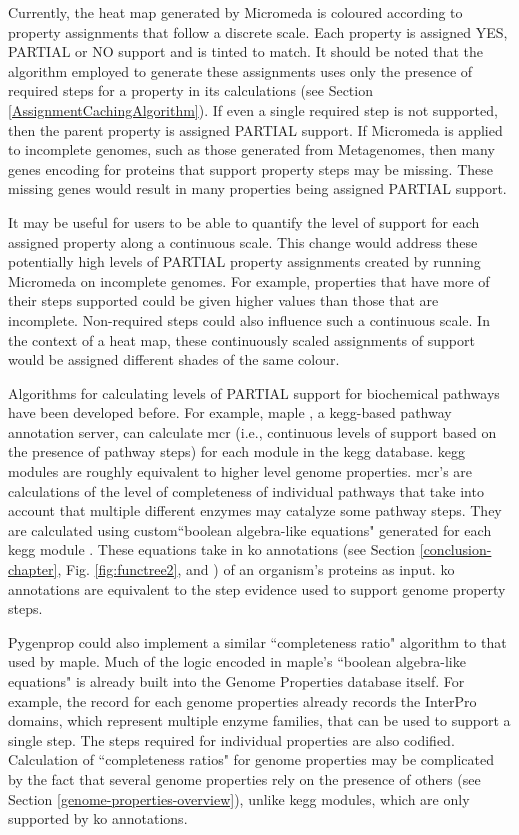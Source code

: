 Currently, the heat map generated by Micromeda is coloured according to property assignments that follow a discrete scale. Each property is assigned YES, PARTIAL or NO support and is tinted to match. It should be noted that the algorithm employed to generate these assignments uses only the presence of required steps for a property in its calculations (see Section \ref{AssignmentCachingAlgorithm}). If even a single required step is not supported, then the parent property is assigned PARTIAL support. If Micromeda is applied to incomplete genomes, such as those generated from Metagenomes, then many genes encoding for proteins that support property steps may be missing. These missing genes would result in many properties being assigned PARTIAL support. 

It may be useful for users to be able to quantify the level of support for each assigned property along a continuous scale. This change would address these potentially high levels of PARTIAL property assignments created by running Micromeda on incomplete genomes. For example, properties that have more of their steps supported could be given higher values than those that are incomplete. Non-required steps could also influence such a continuous scale. In the context of a heat map, these continuously scaled assignments of support would be assigned different shades of the same colour.

Algorithms for calculating levels of PARTIAL support for biochemical pathways have been developed before. For example, \gls{maple} \cite{takami2016automated}, a \gls{kegg}-based pathway annotation server, can calculate \gls{mcr} (i.e., continuous levels of support based on the presence of pathway steps) for each module in the \gls{kegg}  database. \gls{kegg} modules are roughly equivalent to higher level genome properties. \gls{mcr}'s are calculations of the level of completeness of individual pathways that take into account that multiple different enzymes may catalyze some pathway steps. They are calculated using custom``boolean algebra-like equations" generated for each \gls{kegg} module \cite{takami2012evaluation}. These equations take in \gls{ko} annotations (see Section \ref{conclusion-chapter}, Fig. \ref{fig:functree2}, and \cite{mao2005automated}) of an organism's proteins as input. \gls{ko} annotations are equivalent to the step evidence used to support genome property steps. 

Pygenprop could also implement a similar ``completeness ratio" algorithm to that used by \gls{maple}. Much of the logic encoded in \gls{maple}'s ``boolean algebra-like equations" is already built into the Genome Properties database itself. For example, the record for each genome properties already records the InterPro domains, which represent multiple enzyme families, that can be used to support a single step. The steps required for individual properties are also codified. Calculation of ``completeness ratios" for genome properties may be complicated by the fact that several genome properties rely on the presence of others (see Section \ref{genome-properties-overview}), unlike \gls{kegg} modules, which are only supported by \gls{ko} annotations.

